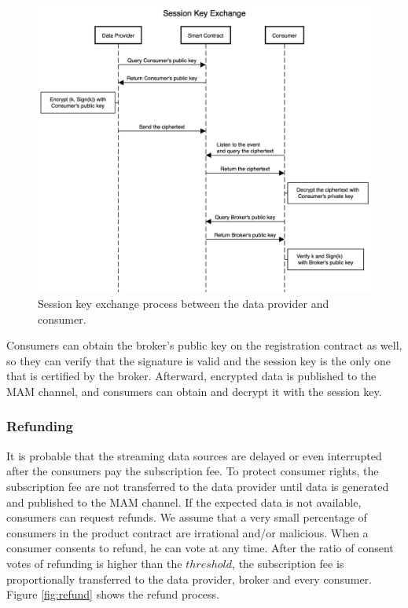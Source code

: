 \documentclass[journal,article,applsci,submit,moreauthors,pdftex]{Definitions/mdpi}
\begin{document}
\begin{figure}[H]
    \centering
    \includegraphics[width=5.5 in]{key_exchange}
    \caption{Session key exchange process between the data provider and consumer.}
    \label{fig:key_exchange}
\end{figure}

Consumers can obtain the broker's public key on the registration contract as well, so they can verify that the signature is valid and the session key is the only one that is certified by the broker. Afterward, encrypted data is published to the MAM channel, and consumers can obtain and decrypt it with the session key.

\subsubsection{Refunding}

It is probable that the streaming data sources are delayed or even interrupted after the consumers pay the subscription fee. To protect consumer rights, the subscription fee are not transferred to the data provider until data is generated and published to the MAM channel. If the expected data is not available, consumers can request refunds. We assume that a very small percentage of consumers in the product contract are irrational and/or malicious. When a consumer consents to refund, he can vote at any time. After the ratio of consent votes of refunding is higher than the $threshold$, the subscription fee is proportionally transferred to the data provider, broker and every consumer. Figure \ref{fig:refund} shows the refund process.
\end{document}
